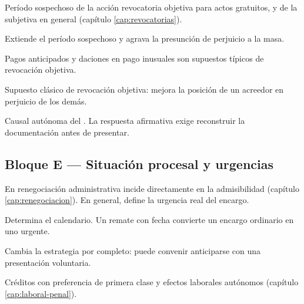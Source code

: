 \begin{cuestionario}
  {Período sospechoso de la acción revocatoria objetiva para actos gratuitos, y de la
  subjetiva en general (capítulo \ref{cap:revocatorias}).}

  {Extiende el período sospechoso y agrava la presunción de perjuicio a la masa.}

  {Pagos anticipados y daciones en pago inusuales son supuestos típicos de revocación
  objetiva.}

  {Supuesto clásico de revocación objetiva: mejora la posición de un acreedor en
  perjuicio de los demás.}

  {Causal autónoma del . La respuesta afirmativa exige reconstruir la
  documentación antes de presentar.}
\end{cuestionario}

\subsection{Bloque E — Situación procesal y urgencias}

\begin{cuestionario}
  {En renegociación administrativa incide directamente en la admisibilidad (capítulo
  \ref{cap:renegociacion}). En general, define la urgencia real del encargo.}

  {Determina el calendario. Un remate con fecha convierte un encargo ordinario en uno
  urgente.}

  {Cambia la estrategia por completo: puede convenir anticiparse con una presentación
  voluntaria.}

  {Créditos con preferencia de primera clase y efectos laborales autónomos (capítulo
  \ref{cap:laboral-penal}).}
\end{cuestionario}

